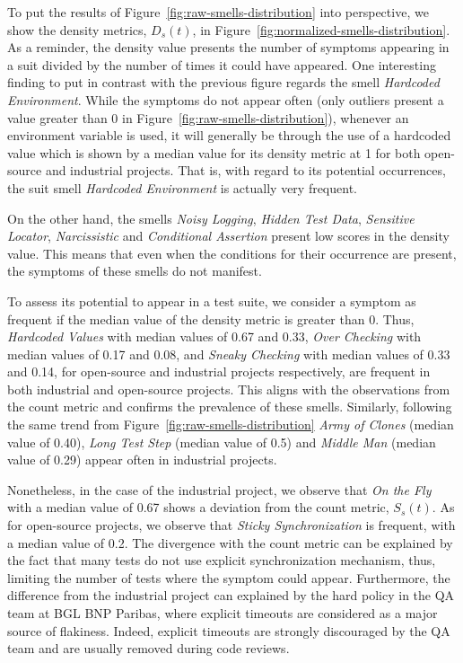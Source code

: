 To put the results of Figure~\ref{fig:raw-smells-distribution} into perspective, we show the density metrics, $D_s(t)$, in Figure~\ref{fig:normalized-smells-distribution}. As a reminder, the density value presents the number of symptoms appearing in a \gls{suit} divided by the number of times it could have appeared. One interesting finding to put in contrast with the previous figure regards the smell \emph{Hardcoded Environment}. While the symptoms do not appear often (only outliers present a value greater than 0 in Figure~\ref{fig:raw-smells-distribution}), whenever an environment variable is used, it will generally be through the use of a hardcoded value which is shown by a median value for its density metric at 1 for both open-source and industrial projects. That is, with regard to its potential occurrences, the \gls{suit} smell \emph{Hardcoded Environment} is actually very frequent.

On the other hand, the smells \emph{Noisy Logging}, \emph{Hidden Test Data}, \emph{Sensitive Locator}, \emph{Narcissistic} and \emph{Conditional Assertion} present low scores in the density value. This means that even when the conditions for their occurrence are present, the symptoms  of these smells do not manifest.


To assess its potential to appear in a test suite, we consider a symptom as frequent if the median value of the density metric is greater than 0. Thus, \emph{Hardcoded Values} with median values of 0.67 and 0.33, \emph{Over Checking} with median values of 0.17 and 0.08, and \emph{Sneaky Checking} with median values of 0.33 and 0.14, for open-source and industrial projects respectively, are frequent in both industrial and open-source projects. This aligns with the observations from  the count metric and confirms the prevalence of these smells. Similarly, following the same trend from Figure~\ref{fig:raw-smells-distribution} \emph{Army of Clones} (median value of 0.40), \emph{Long Test Step} (median value of 0.5) and \emph{Middle Man} (median value of 0.29) appear often in industrial projects.

Nonetheless, in the case of the industrial project, we observe that \emph{On the Fly} with a median value of 0.67 shows a deviation from the count metric, $S_s(t)$. 
As for open-source projects, we observe that \emph{Sticky Synchronization} is frequent, with a median value of 0.2. The divergence with the count metric can be explained by the fact that many tests do not use explicit synchronization mechanism, thus, limiting the number of tests where the symptom could appear. Furthermore, the difference from the industrial project can explained by the hard policy in the QA team at BGL BNP Paribas, where explicit timeouts are considered as a major source of flakiness. Indeed, explicit timeouts are strongly discouraged by the QA team and are usually removed during code reviews.

